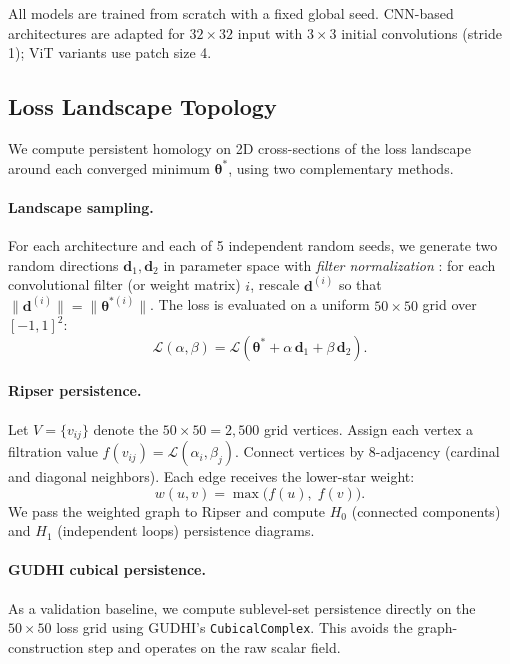 \documentclass[10pt,twocolumn]{article}
\begin{document}
All models are trained from scratch with a fixed global seed. CNN-based architectures are adapted for $32 \times 32$ input with $3 \times 3$ initial convolutions (stride 1); ViT variants use patch size 4.

\subsection{Loss Landscape Topology}
\label{sec:topology}

We compute persistent homology on 2D cross-sections of the loss landscape around each converged minimum $\boldsymbol{\theta}^*$, using two complementary methods.

\paragraph{Landscape sampling.}
For each architecture and each of 5 independent random seeds, we generate two random directions $\mathbf{d}_1, \mathbf{d}_2$ in parameter space with \emph{filter normalization} \citep{li2018visualizing}: for each convolutional filter (or weight matrix) $i$, rescale $\mathbf{d}^{(i)}$ so that $\|\mathbf{d}^{(i)}\| = \|\boldsymbol{\theta}^{*(i)}\|$. The loss is evaluated on a uniform $50 \times 50$ grid over $[-1, 1]^2$:
\begin{equation}
    \mathcal{L}(\alpha, \beta) = \mathcal{L}\!\left(\boldsymbol{\theta}^* + \alpha\,\mathbf{d}_1 + \beta\,\mathbf{d}_2\right).
    \label{eq:landscape}
\end{equation}

\paragraph{Ripser persistence.}
Let $V = \{v_{ij}\}$ denote the $50 \times 50 = 2{,}500$ grid vertices. Assign each vertex a filtration value $f(v_{ij}) = \mathcal{L}(\alpha_i, \beta_j)$. Connect vertices by 8-adjacency (cardinal and diagonal neighbors). Each edge receives the lower-star weight:
\begin{equation}
    w(u,v) = \max\!\bigl(f(u),\; f(v)\bigr).
\end{equation}
We pass the weighted graph to Ripser \citep{bauer2021ripser} and compute $H_0$ (connected components) and $H_1$ (independent loops) persistence diagrams.

\paragraph{GUDHI cubical persistence.}
As a validation baseline, we compute sublevel-set persistence directly on the $50 \times 50$ loss grid using GUDHI's \texttt{CubicalComplex}. This avoids the graph-construction step and operates on the raw scalar field.
\end{document}
